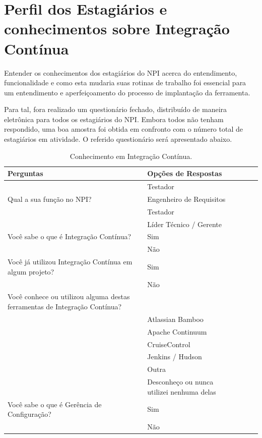 \section{Perfil dos Estagiários e conhecimentos sobre Integração Contínua}
Entender os conhecimentos dos estagiários do NPI acerca do entendimento, funcionalidade e como esta mudaria suas rotinas de trabalho foi essencial para um entendimento e aperfeiçoamento do processo de implantação da ferramenta.

Para tal, fora realizado um questionário fechado, distribuído de maneira eletrônica para todos os estagiários do NPI. Embora todos não tenham respondido, uma boa amostra foi obtida em confronto com o número total de estagiários em atividade. O referido questionário será apresentado abaixo.

\pagebreak
\begin{table}[htb]
\centering
\caption[Conhecimentos em Integração Contínua]{Conhecimento em Integração Contínua.}
\label{tab-ic}
\begin{tabular}{p{5.0cm}l|p{5.0cm}|p{5.40cm}|p{5.40cm}}
  \hline
   \textbf{Perguntas} & \textbf{Opções de Respostas}\\
    \hline
    & Testador \\
    Qual a sua função no NPI? & Engenheiro de Requisitos \\
    & Testador \\
    & Líder Técnico / Gerente \\
    \hline
    Você sabe o que é Integração Contínua? & Sim \\
    & Não \\
    \hline
    Você já utilizou Integração Contínua em algum projeto? & Sim \\
    & Não \\
    \hline
    Você conhece ou utilizou alguma destas ferramentas de Integração Contínua?  & \\
    & Atlassian Bamboo \\
    & Apache Continuum \\
    & CruiseControl \\
    & Jenkins / Hudson \\
    & Outra \\
    & Desconheço ou nunca utilizei nenhuma delas \\
	\hline
	Você sabe o que é Gerência de Configuração? & Sim \\
	& Não \\
	\hline
\end{tabular}
\end{table}

